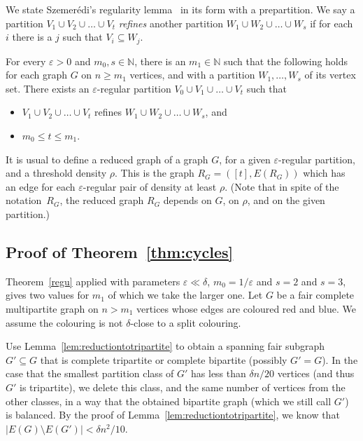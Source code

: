 \documentclass[a4paper,10pt]{article}
\let\eps\varepsilon
\begin{document}
We state Szemer\'edi's regularity lemma~\cite{Sze78} in its form with a prepartition.
We say a partition $V_1\cup V_2\cup\dots\cup V_t$ \emph{refines} another partition $W_1\cup W_2\cup\dots\cup W_s$ if for each $i$ there is a $j$ such that $V_i\subseteq W_j$.

\begin{theorem}\label{regu}
For every $\eps>0$ and $m_0, s\in\mathbb N$, there is an $m_1 \in \mathbb N$ such that the following holds for each graph $G$ on $n\geq m_1$ vertices,
and with a partition $W_1,\dots, W_s$ of its vertex set.
There exists an $\eps$-regular partition $V_0\cup V_1\cup\dots\cup V_t$ such that  
\begin{itemize}
\item $V_1\cup V_2\cup\dots\cup V_t$ refines $W_1\cup W_2\cup\dots\cup W_s$, and
\item $m_0\leq t\leq m_1$.
\end{itemize}
\end{theorem}

It is usual to define a reduced graph of a graph $G$, for a given $\eps$-regular partition, and a threshold density $\rho$. 
This is the graph $R_{G}=([t], E(R_{G}))$ which has an edge for each $\eps$-regular pair of density at least $\rho$. (Note that in spite of the notation~$R_G$, the reduced graph $R_G$ depends on $G$, on $\rho$, and on the given partition.)

 \subsection{Proof of Theorem~\ref{thm:cycles}}

Theorem~\ref{regu} applied with parameters $\eps\ll \delta$, $m_0=1/\eps$ and  $s=2$ and $s=3$, gives two values for $m_1$ of which we take the larger one.
Let $G$ be a fair complete multipartite graph on $n>m_1$ vertices whose edges are coloured red and blue. We assume the colouring is not $\delta$-close to a split colouring. 

Use Lemma~\ref{lem:reductiontotripartite} to obtain a spanning fair subgraph $G'\subseteq G$ that is complete tripartite or complete bipartite (possibly $G'=G$). In the case that  the smallest partition class of $G'$ has less than $\delta n/20$ vertices (and thus $G'$ is tripartite), we delete this  class, and the same number of vertices from the other classes, in a way that the obtained bipartite graph (which we still call $G'$) is balanced.
By the proof of Lemma~\ref{lem:reductiontotripartite}, we know that $|E(G)\setminus E(G')|<\delta n^2/10$. 
\end{document}
